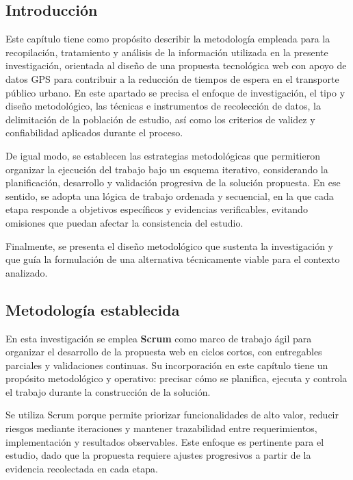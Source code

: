 \subsection{Introducción}

Este capítulo tiene como propósito describir la metodología empleada para la recopilación, tratamiento y análisis de la información utilizada en la presente investigación, orientada al diseño de una propuesta tecnológica web con apoyo de datos GPS para contribuir a la reducción de tiempos de espera en el transporte público urbano. En este apartado se precisa el enfoque de investigación, el tipo y diseño metodológico, las técnicas e instrumentos de recolección de datos, la delimitación de la población de estudio, así como los criterios de validez y confiabilidad aplicados durante el proceso.

De igual modo, se establecen las estrategias metodológicas que permitieron organizar la ejecución del trabajo bajo un esquema iterativo, considerando la planificación, desarrollo y validación progresiva de la solución propuesta. En ese sentido, se adopta una lógica de trabajo ordenada y secuencial, en la que cada etapa responde a objetivos específicos y evidencias verificables, evitando omisiones que puedan afectar la consistencia del estudio.

Finalmente, se presenta el diseño metodológico que sustenta la investigación y que guía la formulación de una alternativa técnicamente viable para el contexto analizado.

\subsection{Metodología establecida}

En esta investigación se emplea \textbf{Scrum} como marco de trabajo ágil para organizar el desarrollo de la propuesta web en ciclos cortos, con entregables parciales y validaciones continuas. Su incorporación en este capítulo tiene un propósito metodológico y operativo: precisar cómo se planifica, ejecuta y controla el trabajo durante la construcción de la solución.

Se utiliza Scrum porque permite priorizar funcionalidades de alto valor, reducir riesgos mediante iteraciones y mantener trazabilidad entre requerimientos, implementación y resultados observables. Este enfoque es pertinente para el estudio, dado que la propuesta requiere ajustes progresivos a partir de la evidencia recolectada en cada etapa.

